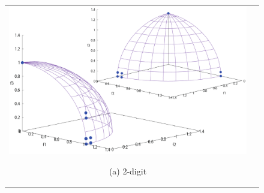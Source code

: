 \documentclass[../main/main]{subfiles}
\begin{document}
\begin{description}
\begin{figure}[htbp]
\begin{tabular}{cc}
\begin{minipage}{0.32\hsize}
\end{minipage}
\begin{minipage}{0.32\hsize}
\includegraphics[width=1\linewidth]{../figures/DTLZ4_another_double.pdf}
\begin{center}
{\footnotesize (a) 2-digit}
\end{center}
\end{minipage}
\end{tabular}
\label{fig:dtlz4}
\end{figure}




\end{description}
\end{document}
